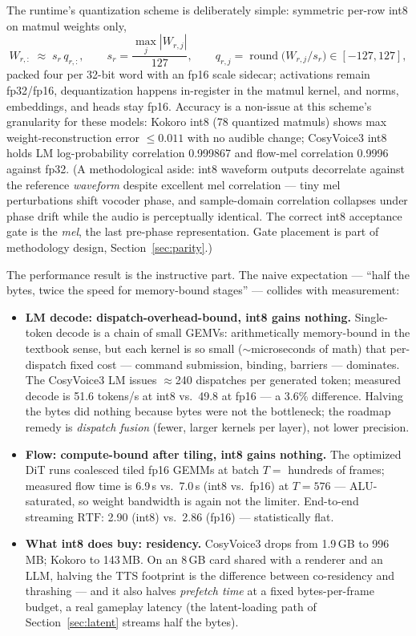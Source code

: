 \documentclass[11pt,a4paper]{article}
\newcommand{\RTF}{\ensuremath{\mathrm{RTF}}}
\begin{document}
The runtime's quantization scheme is deliberately simple: symmetric per-row int8 on
matmul weights only,
\begin{equation}
W_{r,:} \;\approx\; s_r\, q_{r,:}, \qquad
s_r = \frac{\max_j |W_{r,j}|}{127}, \qquad
q_{r,j} = \operatorname{round}\!\big( W_{r,j} / s_r \big) \in [-127, 127],
\label{eq:int8}
\end{equation}
packed four per 32-bit word with an fp16 scale sidecar; activations remain fp32/fp16,
dequantization happens in-register in the matmul kernel, and norms, embeddings, and
heads stay fp16. Accuracy is a non-issue at this scheme's granularity for these models:
Kokoro int8 (78 quantized matmuls) shows max weight-reconstruction error $\le 0.011$
with no audible change; CosyVoice3 int8 holds LM log-probability correlation 0.999867
and flow-mel correlation 0.9996 against fp32. (A methodological aside: int8 waveform
outputs decorrelate against the reference \emph{waveform} despite excellent mel
correlation --- tiny mel perturbations shift vocoder phase, and sample-domain
correlation collapses under phase drift while the audio is perceptually identical. The
correct int8 acceptance gate is the \emph{mel}, the last pre-phase representation. Gate
placement is part of methodology design, Section~\ref{sec:parity}.)

The performance result is the instructive part. The naive expectation --- ``half the
bytes, twice the speed for memory-bound stages'' --- collides with measurement:

\begin{itemize}[leftmargin=2em]
\item \textbf{LM decode: dispatch-overhead-bound, int8 gains nothing.} Single-token
decode is a chain of small GEMVs: arithmetically memory-bound in the textbook sense,
but each kernel is so small ($\sim$microseconds of math) that per-dispatch fixed cost
--- command submission, binding, barriers --- dominates. The CosyVoice3 LM issues
$\approx$240 dispatches per generated token; measured decode is 51.6 tokens/s at int8
vs.\ 49.8 at fp16 --- a 3.6\% difference. Halving the bytes did nothing because bytes
were not the bottleneck; the roadmap remedy is \emph{dispatch fusion} (fewer, larger
kernels per layer), not lower precision.
\item \textbf{Flow: compute-bound after tiling, int8 gains nothing.} The optimized DiT
runs coalesced tiled fp16 GEMMs at batch $T{=}$ hundreds of frames; measured flow time
is 6.9\,s vs.\ 7.0\,s (int8 vs.\ fp16) at $T{=}576$ --- ALU-saturated, so weight
bandwidth is again not the limiter. End-to-end streaming $\RTF$: 2.90 (int8) vs.\ 2.86
(fp16) --- statistically flat.
\item \textbf{What int8 does buy: residency.} CosyVoice3 drops from 1.9\,GB to
996\,MB; Kokoro to 143\,MB. On an 8\,GB card shared with a renderer and an LLM, halving
the TTS footprint is the difference between co-residency and thrashing --- and it also
halves \emph{prefetch time} at a fixed bytes-per-frame budget, a real gameplay latency
(the latent-loading path of Section~\ref{sec:latent} streams half the bytes).
\end{itemize}
\end{document}
